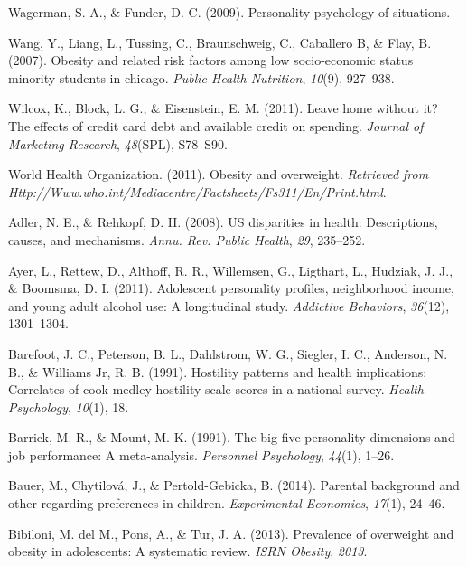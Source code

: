 \documentclass[man]{apa6}
\begin{document}
\leavevmode\hypertarget{ref-wagerman2009personality}{}%
Wagerman, S. A., \& Funder, D. C. (2009). Personality psychology of situations.

\leavevmode\hypertarget{ref-wang2007}{}%
Wang, Y., Liang, L., Tussing, C., Braunschweig, C., Caballero B, \& Flay, B. (2007). Obesity and related risk factors among low socio-economic status minority students in chicago. \emph{Public Health Nutrition}, \emph{10}(9), 927--938.

\leavevmode\hypertarget{ref-wilcox2011leave}{}%
Wilcox, K., Block, L. G., \& Eisenstein, E. M. (2011). Leave home without it? The effects of credit card debt and available credit on spending. \emph{Journal of Marketing Research}, \emph{48}(SPL), S78--S90.

\leavevmode\hypertarget{ref-who2011}{}%
World Health Organization. (2011). Obesity and overweight. \emph{Retrieved from Http://Www.who.int/Mediacentre/Factsheets/Fs311/En/Print.html}.

\leavevmode\hypertarget{ref-adler2008us}{}%
Adler, N. E., \& Rehkopf, D. H. (2008). US disparities in health: Descriptions, causes, and mechanisms. \emph{Annu. Rev. Public Health}, \emph{29}, 235--252.

\leavevmode\hypertarget{ref-ayer2011adolescent}{}%
Ayer, L., Rettew, D., Althoff, R. R., Willemsen, G., Ligthart, L., Hudziak, J. J., \& Boomsma, D. I. (2011). Adolescent personality profiles, neighborhood income, and young adult alcohol use: A longitudinal study. \emph{Addictive Behaviors}, \emph{36}(12), 1301--1304.

\leavevmode\hypertarget{ref-barefoot1991hostility}{}%
Barefoot, J. C., Peterson, B. L., Dahlstrom, W. G., Siegler, I. C., Anderson, N. B., \& Williams Jr, R. B. (1991). Hostility patterns and health implications: Correlates of cook-medley hostility scale scores in a national survey. \emph{Health Psychology}, \emph{10}(1), 18.

\leavevmode\hypertarget{ref-barrick1991big}{}%
Barrick, M. R., \& Mount, M. K. (1991). The big five personality dimensions and job performance: A meta-analysis. \emph{Personnel Psychology}, \emph{44}(1), 1--26.

\leavevmode\hypertarget{ref-bauer2014parental}{}%
Bauer, M., Chytilová, J., \& Pertold-Gebicka, B. (2014). Parental background and other-regarding preferences in children. \emph{Experimental Economics}, \emph{17}(1), 24--46.

\leavevmode\hypertarget{ref-bibiloni2013prevalence}{}%
Bibiloni, M. del M., Pons, A., \& Tur, J. A. (2013). Prevalence of overweight and obesity in adolescents: A systematic review. \emph{ISRN Obesity}, \emph{2013}.
\end{document}
